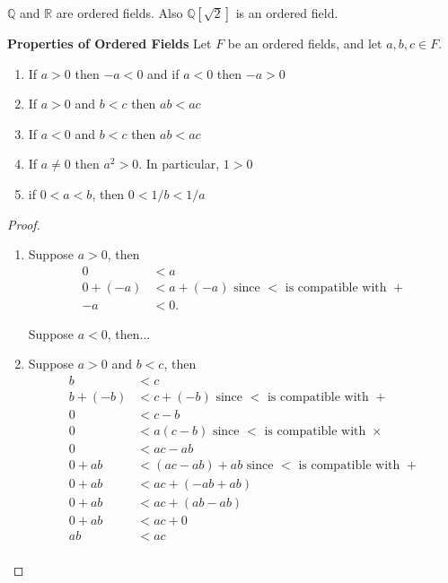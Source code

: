 \begin{exmp}
$\mathbb{Q}$ and $\mathbb{R}$ are ordered fields. Also $\mathbb{Q}[\sqrt{2}]$ is an ordered field.
\end{exmp}

\begin{thm}\textbf{Properties of Ordered Fields}
Let $F$ be an ordered fields, and let $a,b,c\in F$.
\begin{enumerate}
\item If $a>0$ then $-a<0$ and if $a<0$ then $-a>0$
\item If $a>0$ and $b < c$ then $ab<ac$
\item If $a<0$ and $b < c$ then $ab<ac$
\item If $a\neq 0$ then $a^2 > 0$. In particular, $1>0$
\item if $0<a<b$, then $0<1/b<1/a$
\end{enumerate}
\end{thm}

\begin{proof}
\leavevmode
\begin{enumerate}
\item Suppose $a>0$, then
\begin{align*}
    0 &< a \\
    0 + (-a) & < a + (-a) \text{ since $<$ is compatible with $+$}\\
    -a & < 0.
\end{align*}

Suppose $a<0$, then...

\item Suppose $a>0$ and $b < c$, then
\begin{align*}
    b & < c \\
    b + (-b) & < c+ (-b) \text{ since $<$ is compatible with $+$}\\
    0 &< c-b \\
    0 & < a(c-b) \text{ since $<$ is compatible with $\times $} \\
    0 & < ac - ab \\
    0+ab & < (ac-ab)+ab \text{ since $<$ is compatible with $+$} \\
    0+ab & < ac + (-ab+ab) \\
    0+ab & < ac + (ab - ab)\\
    0+ab & < ac + 0\\
    ab & < ac\\
\end{align*}
\end{enumerate}
\end{proof}

